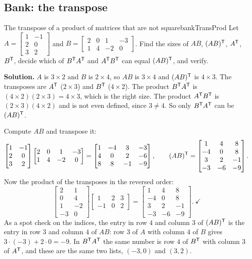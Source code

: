 \documentclass[11pt]{article}
\begin{document}
\subsection*{Bank: the transpose}

\begin{exmp}{The transpose of a product of matrices that are not square}{bankTransProd}
Let $A=\begin{bmatrix}1&-1\\2&0\\3&2\end{bmatrix}$ and $B=\begin{bmatrix}2&0&1&-3\\1&4&-2&0\end{bmatrix}$. Find the sizes of $AB$, $(AB)^{\mathsf T}$, $A^{\mathsf T}$, $B^{\mathsf T}$, decide which of $B^{\mathsf T} A^{\mathsf T}$ and $A^{\mathsf T} B^{\mathsf T}$ can equal $(AB)^{\mathsf T}$, and verify.

\textbf{Solution.} $A$ is $3\times2$ and $B$ is $2\times4$, so $AB$ is $3\times4$ and $(AB)^{\mathsf T}$ is $4\times3$. The transposes are $A^{\mathsf T}$ ($2\times3$) and $B^{\mathsf T}$ ($4\times2$). The product $B^{\mathsf T} A^{\mathsf T}$ is $(4\times2)(2\times3)=4\times3$, which is the right size. The product $A^{\mathsf T} B^{\mathsf T}$ is $(2\times3)(4\times2)$ and is not even defined, since $3\neq4$. So only $B^{\mathsf T} A^{\mathsf T}$ can be $(AB)^{\mathsf T}$.

Compute $AB$ and transpose it:
\[
\begin{bmatrix}1&-1\\2&0\\3&2\end{bmatrix}\begin{bmatrix}2&0&1&-3\\1&4&-2&0\end{bmatrix}=\begin{bmatrix}1&-4&3&-3\\4&0&2&-6\\8&8&-1&-9\end{bmatrix},\qquad
(AB)^{\mathsf T}=\begin{bmatrix}1&4&8\\-4&0&8\\3&2&-1\\-3&-6&-9\end{bmatrix}.
\]
Now the product of the transposes in the reversed order:
\[
\begin{bmatrix}2&1\\0&4\\1&-2\\-3&0\end{bmatrix}\begin{bmatrix}1&2&3\\-1&0&2\end{bmatrix}=\begin{bmatrix}1&4&8\\-4&0&8\\3&2&-1\\-3&-6&-9\end{bmatrix}.\ \checkmark
\]
As a spot check on the indices, the entry in row $4$ and column $3$ of $(AB)^{\mathsf T}$ is the entry in row $3$ and column $4$ of $AB$: row $3$ of $A$ with column $4$ of $B$ gives $3\cdot(-3)+2\cdot0=-9$. In $B^{\mathsf T} A^{\mathsf T}$ the same number is row $4$ of $B^{\mathsf T}$ with column $3$ of $A^{\mathsf T}$, and these are the same two lists, $(-3,0)$ and $(3,2)$.


\end{exmp}
\end{document}
